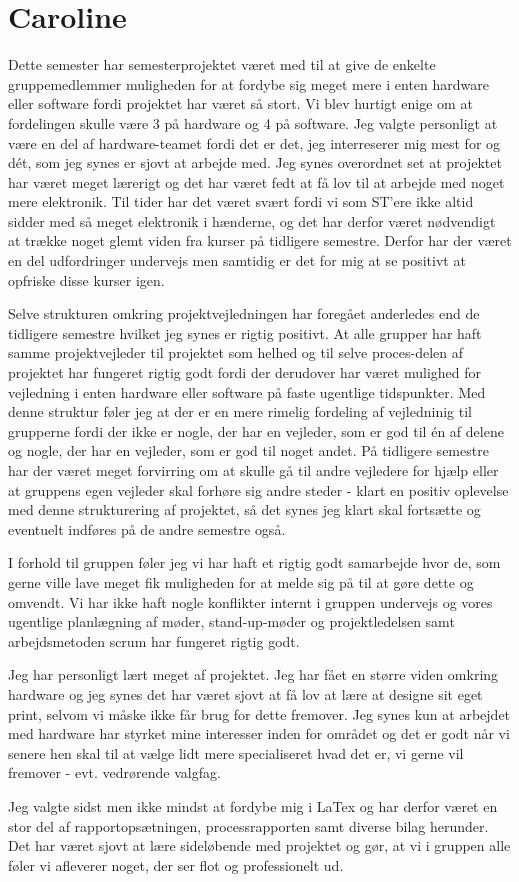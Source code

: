 \section{Caroline}
Dette semester har semesterprojektet været med til at give de enkelte gruppemedlemmer muligheden for at fordybe sig meget mere i enten hardware eller software fordi projektet har været så stort. Vi blev hurtigt enige om at fordelingen skulle være 3 på hardware og 4 på software. Jeg valgte personligt at være en del af hardware-teamet fordi det er det, jeg interreserer mig mest for og dét, som jeg synes er sjovt at arbejde med. Jeg synes overordnet set at projektet har været meget lærerigt og det har været fedt at få lov til at arbejde med noget mere elektronik. Til tider har det været svært fordi vi som ST'ere ikke altid sidder med så meget elektronik i hænderne, og det har derfor været nødvendigt at trække noget glemt viden fra kurser på tidligere semestre. Derfor har der været en del udfordringer undervejs men samtidig er det for mig at se positivt at opfriske disse kurser igen. 

Selve strukturen omkring projektvejledningen har foregået anderledes end de tidligere semestre hvilket jeg synes er rigtig positivt. At alle grupper har haft samme projektvejleder til projektet som helhed og til selve proces-delen af projektet har fungeret rigtig godt fordi der derudover har været mulighed for vejledning i enten hardware eller software på faste ugentlige tidspunkter. Med denne struktur føler jeg at der er en mere rimelig fordeling af vejledninig til grupperne fordi der ikke er nogle, der har en vejleder, som er god til én af delene og nogle, der har en vejleder, som er god til noget andet. På tidligere semestre har der været meget forvirring om at skulle gå til andre vejledere for hjælp eller at gruppens egen vejleder skal forhøre sig andre steder - klart en positiv oplevelse med denne strukturering af projektet, så det synes jeg klart skal fortsætte og eventuelt indføres på de andre semestre også. 

I forhold til gruppen føler jeg vi har haft et rigtig godt samarbejde hvor de, som gerne ville lave meget fik muligheden for at melde sig på til at gøre dette og omvendt. Vi har ikke haft nogle konflikter internt i gruppen undervejs og vores ugentlige planlægning af møder, stand-up-møder og projektledelsen samt arbejdsmetoden scrum har fungeret rigtig godt.

Jeg har personligt lært meget af projektet. Jeg har fået en større viden omkring hardware og jeg synes det har været sjovt at få lov at lære at designe sit eget print, selvom vi måske ikke får brug for dette fremover. Jeg synes kun at arbejdet med hardware har styrket mine interesser inden for området og det er godt når vi senere hen skal til at vælge lidt mere specialiseret hvad det er, vi gerne vil fremover - evt. vedrørende valgfag. 

Jeg valgte sidst men ikke mindst at fordybe mig i LaTex og har derfor været en stor del af rapportopsætningen, processrapporten samt diverse bilag herunder. Det har været sjovt at lære sideløbende med projektet og gør, at vi i gruppen alle føler vi afleverer noget, der ser flot og professionelt ud. 
\clearpage